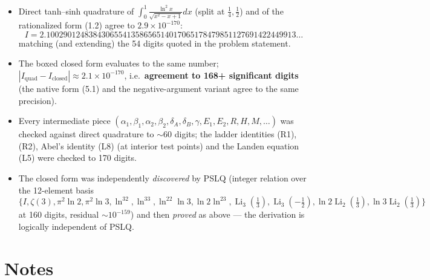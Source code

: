 \documentclass[11pt]{article}
\theoremstyle{remark}
\begin{document}
\begin{itemize}
\item Direct tanh--sinh quadrature of $\int_0^1\frac{\ln^2x}{\sqrt{x^2-x+1}}dx$ (split at $\frac14,\frac12$) and of the rationalized form (1.2) agree to $2.9\times10^{-170}$:
\[
I=2.10029012483843065541358656514017065178479851127691422449913\ldots
\]
matching (and extending) the 54 digits quoted in the problem statement.
\item The boxed closed form evaluates to the same number; $|I_{\text{quad}}-I_{\text{closed}}|\approx2.1\times10^{-170}$, i.e.\ \textbf{agreement to 168+ significant digits} (the native form (5.1) and the negative-argument variant agree to the same precision).
\item Every intermediate piece $(\alpha_1,\beta_1,\alpha_2,\beta_2,\delta_A,\delta_B,\gamma,E_1,E_2,R,H,M,\dots)$ was checked against direct quadrature to $\sim60$ digits; the ladder identities (R1), (R2), Abel's identity (L8) (at interior test points) and the Landen equation (L5) were checked to 170 digits.
\item The closed form was independently \textit{discovered} by PSLQ (integer relation over the 12-element basis
\[
\{I,\zeta(3),\pi^2\ln2,\pi^2\ln3,\ln^32,\ln^33,\ln^22\ln3,\ln2\ln^23,\operatorname{Li}_3(\tfrac13),\operatorname{Li}_3(-\tfrac12),\ln2\operatorname{Li}_2(\tfrac13),\ln3\operatorname{Li}_2(\tfrac13)\}
\]
at 160 digits, residual $\sim10^{-159}$) and then \textit{proved} as above --- the derivation is logically independent of PSLQ.
\end{itemize}

\section*{Notes}
\end{document}
